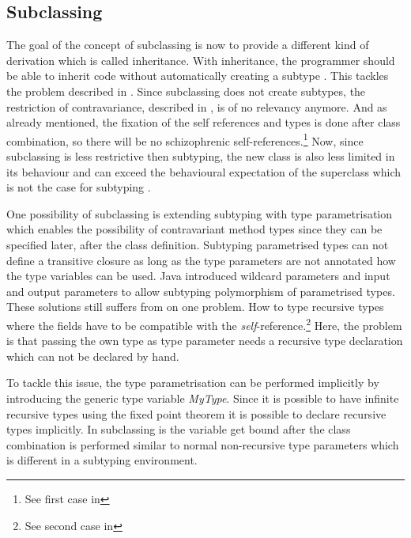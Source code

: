 \subsection{Subclassing}
 The goal of the concept of
subclassing is now to provide a different kind of derivation which
is called inheritance. With inheritance, the programmer should
be able to inherit code without automatically creating a subtype
\cite{simons_theory_2002-2}. This tackles the problem described in
. Since subclassing does not create subtypes, the
restriction of contravariance, described in ,
is of no relevancy anymore. And as already mentioned, the fixation of
the self references and types is done after class combination, so there
will be no schizophrenic self-references.\footnote{See first case in
} Now, since subclassing is less restrictive
then subtyping, the new class is also less limited in its behaviour and
can exceed the behavioural expectation of the superclass which is not
the case for subtyping \cite{simons_theory_2002-2}.

One possibility of subclassing is extending subtyping with type
parametrisation which enables the possibility of contravariant
method types since they can be specified later, after the class
definition. Subtyping parametrised types can not define a transitive
closure as long as the type parameters are not annotated how the
type variables can be used. Java introduced wildcard parameters and
\cs input and output parameters to allow subtyping polymorphism
of parametrised types. These solutions still suffers from on one
problem. How to type recursive types where the fields have to be
compatible with the \emph{self}-reference.\footnote{See second case in
} Here, the problem is that passing the own
type as type parameter needs a recursive type declaration which can not
be declared by hand.

To tackle this issue, the type parametrisation can be performed implicitly
by introducing the generic type variable \emph{MyType}. Since it is
possible to have infinite recursive types using the fixed point theorem
\cite{pierce_types_2002} it is possible to declare recursive types
implicitly. In subclassing is the \mytype variable get bound after the
class combination is performed similar to normal non-recursive type
parameters which is different in a subtyping environment.

